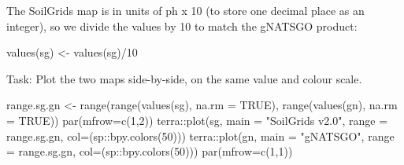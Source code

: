 \documentclass[
  letterpaper,
  DIV=11,
  numbers=noendperiod]{scrartcl}
\newenvironment{Shaded}{\begin{snugshade}}{\end{snugshade}}
\newcommand{\AttributeTok}[1]{\textcolor[rgb]{0.40,0.45,0.13}{#1}}
\newcommand{\ConstantTok}[1]{\textcolor[rgb]{0.56,0.35,0.01}{#1}}
\newcommand{\DecValTok}[1]{\textcolor[rgb]{0.68,0.00,0.00}{#1}}
\newcommand{\FunctionTok}[1]{\textcolor[rgb]{0.28,0.35,0.67}{#1}}
\newcommand{\NormalTok}[1]{\textcolor[rgb]{0.00,0.23,0.31}{#1}}
\newcommand{\OtherTok}[1]{\textcolor[rgb]{0.00,0.23,0.31}{#1}}
\newcommand{\SpecialCharTok}[1]{\textcolor[rgb]{0.37,0.37,0.37}{#1}}
\newcommand{\StringTok}[1]{\textcolor[rgb]{0.13,0.47,0.30}{#1}}
\begin{document}
The SoilGrids map is in units of ph x 10 (to store one decimal place as
an integer), so we divide the values by 10 to match the gNATSGO product:

\begin{Shaded}
\begin{Highlighting}[]
\FunctionTok{values}\NormalTok{(sg) }\OtherTok{\textless{}{-}} \FunctionTok{values}\NormalTok{(sg)}\SpecialCharTok{/}\DecValTok{10}
\end{Highlighting}
\end{Shaded}

Task: Plot the two maps side-by-side, on the same value and colour
scale.

\begin{Shaded}
\begin{Highlighting}[]
\NormalTok{range.sg.gn }\OtherTok{\textless{}{-}} \FunctionTok{range}\NormalTok{(}\FunctionTok{range}\NormalTok{(}\FunctionTok{values}\NormalTok{(sg), }\AttributeTok{na.rm =} \ConstantTok{TRUE}\NormalTok{), }
                      \FunctionTok{range}\NormalTok{(}\FunctionTok{values}\NormalTok{(gn), }\AttributeTok{na.rm =} \ConstantTok{TRUE}\NormalTok{))}
\FunctionTok{par}\NormalTok{(}\AttributeTok{mfrow=}\FunctionTok{c}\NormalTok{(}\DecValTok{1}\NormalTok{,}\DecValTok{2}\NormalTok{))}
\NormalTok{terra}\SpecialCharTok{::}\FunctionTok{plot}\NormalTok{(sg, }\AttributeTok{main =} \StringTok{"SoilGrids v2.0"}\NormalTok{, }
     \AttributeTok{range =}\NormalTok{ range.sg.gn, }\AttributeTok{col=}\NormalTok{(sp}\SpecialCharTok{::}\FunctionTok{bpy.colors}\NormalTok{(}\DecValTok{50}\NormalTok{)))}
\NormalTok{terra}\SpecialCharTok{::}\FunctionTok{plot}\NormalTok{(gn, }\AttributeTok{main =} \StringTok{"gNATSGO"}\NormalTok{, }
     \AttributeTok{range =}\NormalTok{ range.sg.gn, }\AttributeTok{col=}\NormalTok{(sp}\SpecialCharTok{::}\FunctionTok{bpy.colors}\NormalTok{(}\DecValTok{50}\NormalTok{)))}
\FunctionTok{par}\NormalTok{(}\AttributeTok{mfrow=}\FunctionTok{c}\NormalTok{(}\DecValTok{1}\NormalTok{,}\DecValTok{1}\NormalTok{))}
\end{Highlighting}
\end{Shaded}
\end{document}
